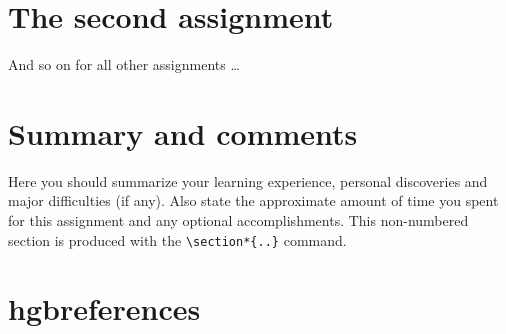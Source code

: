\documentclass[english,notitlepage,smartquotes]{hgbreport}
\begin{document}

\section{The second assignment}

And so on for all other assignments \ldots


\section*{Summary and comments}

Here you should summarize your learning experience, personal discoveries and
major difficulties (if any). Also state the approximate amount of time you
spent for this assignment and any optional accomplishments. This non-numbered
section is produced with the \verb!\section*{..}! command.

  
\section*{hgbreferences}

\printbibliography[heading=noheader]

\end{document}
